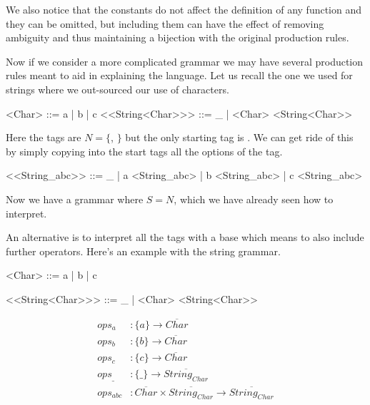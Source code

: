 We also notice that 
the constants do not affect the definition of any function and they can be 
omitted, but including them can have the effect of removing ambiguity and thus 
maintaining a bijection with the original production rules.


Now if we consider a more complicated grammar we may have several production rules 
meant to aid in explaining the language.  Let us recall the one we used for strings
where we out-sourced our use of characters.
\begin{center}
\begin{Gcode}[]
<Char> ::= a | b | c 
<<String<Char>>> ::= _
                  | <Char> <String<Char>>
\end{Gcode}
\end{center}
Here the tags are $N=\{$, $\}$ but the 
only starting tag is . We can get ride of this by simply 
copying into the start tags all the options of the  tag.
\begin{center}
\begin{Gcode}[]
<<String_abc>> ::= _
                | a <String_abc>
                | b <String_abc>
                | c <String_abc>
\end{Gcode}
\end{center}
Now we have a grammar where $S=N$, which we have already seen how to interpret.

An alternative is to interpret all the tags with a base which means to also 
include further operators.  Here's an example with the string grammar.
\begin{center}
\begin{minipage}{0.45\textwidth}
\begin{Gcode}[]
<Char> ::= a
    | b
    | c 

<<String<Char>>> ::= _
    | <Char> <String<Char>>
\end{Gcode}
\end{minipage}
\hfill 
\begin{minipage}{0.5\textwidth}
\begin{align*}
ops_a &:\{a\}\to \overline{Char}\\
ops_b &:\{b\}\to \overline{Char}\\
ops_c &:\{c\}\to \overline{Char}\\
ops_{\_} & : \{\_ \} \to \overline{String_{Char}}\\
ops_{abc} & : \overline{Char}\times \overline{String_{Char}} \to \overline{String_{Char}}
\end{align*}    
\end{minipage}
\end{center}
    
